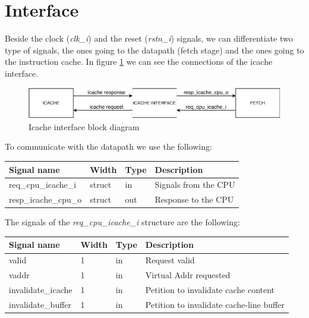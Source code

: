 \section{Interface}
\label{chapter 4}

Beside the clock (\textit{clk\_i}) and the reset (\textit{rstn\_i}) signals, we can differentiate two type of signals, the ones going to the datapath (fetch stage) and the ones going to the instruction cache. In figure \ref{fig:diagram} we can see the connections of the icache interface.

\begin{figure}[h]
	\centering
	\includegraphics[width=\textwidth]{Figure/diagram}
	\caption{Icache interface block diagram}
	\label{fig:diagram}
\end{figure}


To communicate with the datapath we use the following:

\begin{table}[H]
\centering
\begin{tabular}{llll}
\textbf{Signal name} & \textbf{Width} & \textbf{Type} & \textbf{Description} \\
\hline
req\_cpu\_icache\_i & struct & in & Signals from the CPU \\
resp\_icache\_cpu\_o & struct & out & Response to the CPU \\
\end{tabular}
\end{table}


The signals of the \textit{req\_cpu\_icache\_i} structure are the following:

\begin{table}[H]
	\centering
	\begin{tabular}{llll}
		\textbf{Signal name} & \textbf{Width} & \textbf{Type} & \textbf{Description} \\
		\hline
		valid & 1 & in & Request valid \\
		vaddr & 1 & in & Virtual Addr requested \\
		invalidate\_icache & 1 & in & Petition to invalidate cache content \\
		invalidate\_buffer & 1 & in & Petition to invalidate cache-line buffer \\
	\end{tabular}
\end{table}

